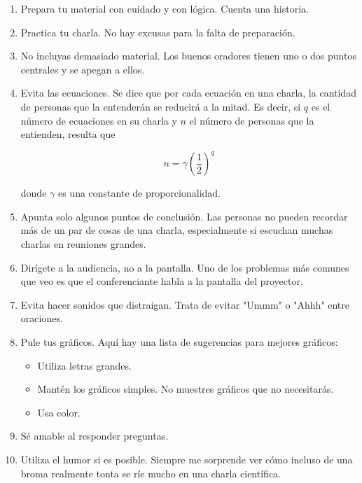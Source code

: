 \documentclass[12pt]{article}
\begin{document}
\begin{enumerate}

\item Prepara tu material con cuidado y con lógica. Cuenta una historia.

\item Practica tu charla. No hay excusas para la falta de preparación.

\item No incluyas demasiado material. Los buenos oradores tienen uno o dos puntos centrales y se apegan a ellos.

\item Evita las ecuaciones. Se dice que por cada ecuación en una charla, la cantidad de personas que la entenderán se reducirá a la mitad. Es decir, si $q$ es el número de ecuaciones en su charla y $n$ el número de personas que la entienden, resulta que


\begin{equation}
n = \gamma \left(\frac{1}{2}\right)^q
\end{equation}

donde $\gamma$ es una constante de proporcionalidad.

\item Apunta solo algunos puntos de conclusión. Las personas no pueden recordar más de un par de cosas de una charla, especialmente si escuchan muchas charlas en reuniones grandes.

\item Dirígete a la audiencia, no a la pantalla. Uno de los problemas más comunes que veo es que el conferenciante habla a la pantalla del proyector.

\item Evita hacer sonidos que distraigan. Trata de evitar "Ummm" o "Ahhh" entre oraciones.

\item Pule tus gráficos. Aquí hay una lista de sugerencias para mejores gráficos:


\begin{itemize}

\item Utiliza letras grandes.

\item Mantén los gráficos simples. No muestres gráficos que no necesitarás.

\item Usa color.

\end{itemize}


\item Sé amable al responder preguntas.

\item Utiliza el humor si es posible. Siempre me sorprende ver cómo incluso de una broma realmente tonta se ríe mucho en una charla científica.

\end{enumerate}
\end{document}
